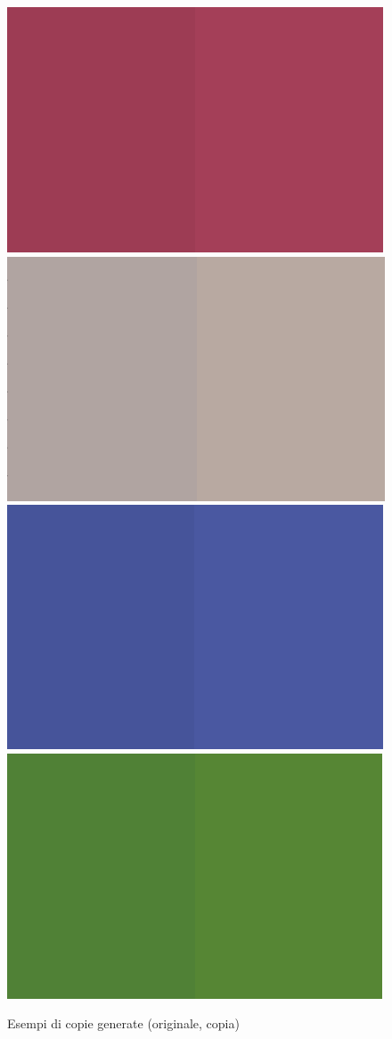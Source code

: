 \begin{figure}
\begin{center}
	\includegraphics[scale=0.5]{images/rete1-colore1.PNG}
	\includegraphics[scale=0.5]{images/rete1-colore2.PNG}
	\includegraphics[scale=0.5]{images/rete1-colore3.PNG}
	\includegraphics[scale=0.5]{images/rete1-colore4.PNG}
\end{center}
\caption{Esempi di copie generate (originale, copia)}
\end{figure}

